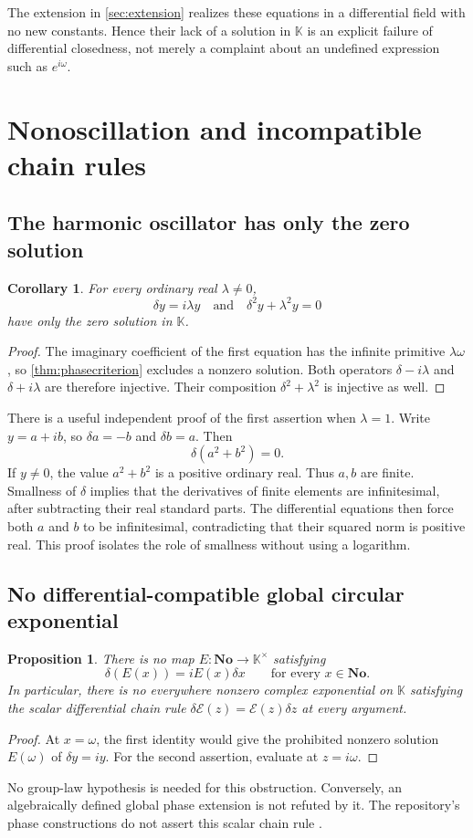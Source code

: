 \documentclass[11pt,letterpaper]{article}
\numberwithin{equation}{section}
\newtheorem{proposition}[theorem]{Proposition}
\newtheorem{corollary}[theorem]{Corollary}
\theoremstyle{definition}
\theoremstyle{remark}
\newcommand{\No}{\mathbf{No}}
\newcommand{\K}{\mathbb K}
\begin{document}
The extension in \cref{sec:extension} realizes these equations in a differential field with no new constants. Hence their lack of a solution in $\K$ is an explicit failure of differential closedness, not merely a complaint about an undefined expression such as $e^{i\omega}$.

\section{Nonoscillation and incompatible chain rules}\label{sec:nonosc}

\subsection{The harmonic oscillator has only the zero solution}
\begin{corollary}\label{cor:oscillator}
For every ordinary real $\lambda\ne0$,
\[
 \delta y=i\lambda y
 \quad\text{and}\quad
 \delta^2y+\lambda^2y=0
\]
have only the zero solution in $\K$.
\end{corollary}
\begin{proof}
The imaginary coefficient of the first equation has the infinite primitive $\lambda\omega$, so \cref{thm:phasecriterion} excludes a nonzero solution. Both operators $\delta-i\lambda$ and $\delta+i\lambda$ are therefore injective. Their composition $\delta^2+\lambda^2$ is injective as well.
\end{proof}

There is a useful independent proof of the first assertion when $\lambda=1$. Write $y=a+ib$, so $\delta a=-b$ and $\delta b=a$. Then
\[
 \delta(a^2+b^2)=0.
\]
If $y\ne0$, the value $a^2+b^2$ is a positive ordinary real. Thus $a,b$ are finite. Smallness of $\delta$ implies that the derivatives of finite elements are infinitesimal, after subtracting their real standard parts. The differential equations then force both $a$ and $b$ to be infinitesimal, contradicting that their squared norm is positive real. This proof isolates the role of smallness without using a logarithm.

\subsection{No differential-compatible global circular exponential}
\begin{proposition}\label{prop:noglobal}
There is no map $E:\No\to\K^\times$ satisfying
\[
 \delta(E(x))=iE(x)\delta x\qquad\text{for every }x\in\No.
\]
In particular, there is no everywhere nonzero complex exponential on $\K$ satisfying the scalar differential chain rule $\delta\mathcal E(z)=\mathcal E(z)\delta z$ at every argument.
\end{proposition}
\begin{proof}
At $x=\omega$, the first identity would give the prohibited nonzero solution $E(\omega)$ of $\delta y=iy$. For the second assertion, evaluate at $z=i\omega$.
\end{proof}
No group-law hypothesis is needed for this obstruction. Conversely, an algebraically defined global phase extension is not refuted by it. The repository's phase constructions do not assert this scalar chain rule \cite{RepoTrig}.
\end{document}
